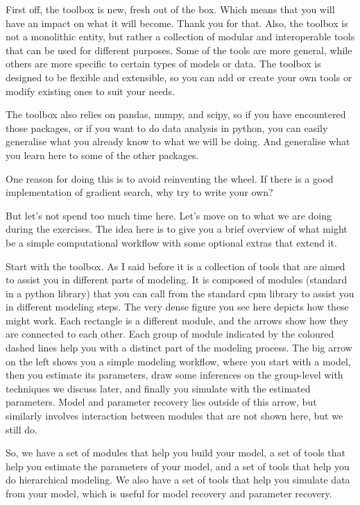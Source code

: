\documentclass[12pt]{article}
\begin{document}
First off, the toolbox is new, fresh out of the box. Which means that you will have an impact on what it will become. Thank you for that. Also, the toolbox is not a monolithic entity, but rather a collection of modular and interoperable tools that can be used for different purposes. Some of the tools are more general, while others are more specific to certain types of models or data. The toolbox is designed to be flexible and extensible, so you can add or create your own tools or modify existing ones to suit your needs.

The toolbox also relies on pandas, numpy, and scipy, so if you have encountered those packages, or if you want to do data analysis in python, you can easily generalise what you already know to what we will be doing. And generalise what you learn here to some of the other packages.

One reason for doing this is to avoid reinventing the wheel. If there is a good implementation of gradient search, why try to  write your own? 

But let's not spend too much time here. Let's move on to what we are doing during the exercises. The idea here is to give you a brief overview of what might be a simple computational workflow with some optional extras that extend it.

Start with the toolbox. As I said before it is a collection of tools that are aimed to assist you in different parts of modeling.  It is composed of modules (standard in a python library) that you can call from the standard cpm library to assist you in different modeling steps. The very dense figure you see here depicts how these might work. Each rectangle is a different module, and the arrows show how they are connected to each other. Each group of module indicated by the coloured dashed lines help you with a distinct part of the modeling process. The big arrow on the left shows you a simple modeling workflow, where you start with a model, then you estimate its parameters, draw some inferences on the group-level with techniques we discuss later, and finally you simulate with the estimated parameters. Model and parameter recovery lies outside of this arrow, but similarly involves interaction between modules that are not shown here, but we still do.

So, we have a set of modules that help you build your model, a set of tools that help  you estimate the parameters of your model, and a set of tools that help you do hierarchical modeling. We also have a set of tools that help you simulate data from your model, which is useful for model recovery and parameter recovery.
\end{document}
